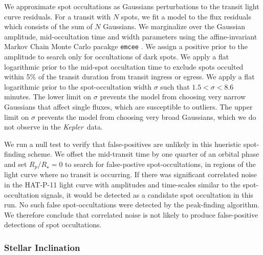 \documentclass[iop]{emulateapj}
\newcommand{\kepler}{\textit{Kepler}}
\begin{document}
We approximate spot occultations as Gaussians perturbations to the transit light curve residuals. For a transit with $N$ spots, we fit a model to the flux residuals which consists of the sum of $N$ Gaussians. We marginalize over the Gaussian amplitude, mid-occultation time and width parameters using the affine-invariant Markov Chain Monte Carlo pacakge \texttt{emcee} \citep{Foreman-Mackey2013}. We assign a positive prior to the amplitude to search only for occultations of dark spots. We apply a flat logarithmic prior to the mid-spot occultation time to exclude spots occulted within 5\% of the transit duration from transit ingress or egress. We apply a flat logarithmic prior to the spot-occultation width $\sigma$ such that $1.5 < \sigma < 8.6$ minutes. The lower limit on $\sigma$ prevents the model from choosing very narrow Gaussians that affect single fluxes, which are susceptible to outliers. The upper limit on $\sigma$ prevents the model from choosing very broad Gaussians, which we do not observe in the \kepler\ data.


We run a null test to verify that false-positives are unlikely in this hueristic spot-finding scheme. We offset the mid-transit time by one quarter of an orbital phase and set $R_p/R_\star = 0$ to search for false-postive spot-occultations, in regions of the light curve where no transit is occurring. If there was significant correlated noise in the HAT-P-11 light curve with amplitudes and time-scales similar to the spot-occultation signals, it would be detected as a candidate spot occultation in this run. No such false spot-occultations were detected by the peak-finding algorithm. We therefore conclude that correlated noise is not likely to produce false-positive detections of spot occultations.



\subsubsection{Stellar Inclination}
\end{document}
